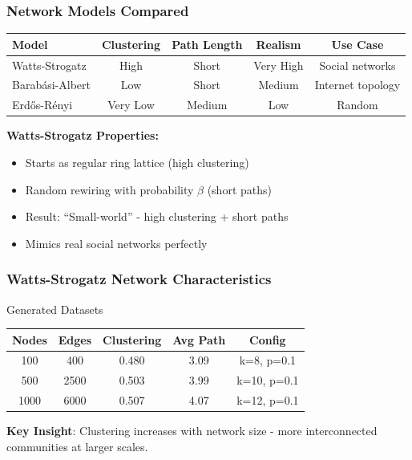 \documentclass{beamer}
\begin{document}
\begin{frame}
\frametitle{Network Models Compared}

\begin{table}
\centering
\begin{tabular}{lcccc}
\toprule
\textbf{Model} & \textbf{Clustering} & \textbf{Path Length} & \textbf{Realism} & \textbf{Use Case} \\
\midrule
Watts-Strogatz & High & Short & Very High & Social networks \\
Barabási-Albert & Low & Short & Medium & Internet topology \\
Erdős-Rényi & Very Low & Medium & Low & Random \\
\bottomrule
\end{tabular}
\end{table}

\vspace{0.5cm}

\textbf{Watts-Strogatz Properties:}
\begin{itemize}
    \item Starts as regular ring lattice (high clustering)
    \item Random rewiring with probability $\beta$ (short paths)
    \item Result: ``Small-world'' - high clustering + short paths
    \item Mimics real social networks perfectly
\end{itemize}
\end{frame}

\begin{frame}
\frametitle{Watts-Strogatz Network Characteristics}

\begin{block}{Generated Datasets}
\begin{table}
\centering
\begin{tabular}{ccccc}
\toprule
\textbf{Nodes} & \textbf{Edges} & \textbf{Clustering} & \textbf{Avg Path} & \textbf{Config} \\
\midrule
100 & 400 & 0.480 & 3.09 & k=8, p=0.1 \\
500 & 2500 & 0.503 & 3.99 & k=10, p=0.1 \\
1000 & 6000 & 0.507 & 4.07 & k=12, p=0.1 \\
\bottomrule
\end{tabular}
\end{table}
\end{block}

\textbf{Key Insight}: Clustering increases with network size - more interconnected communities at larger scales.
\end{frame}
\end{document}
